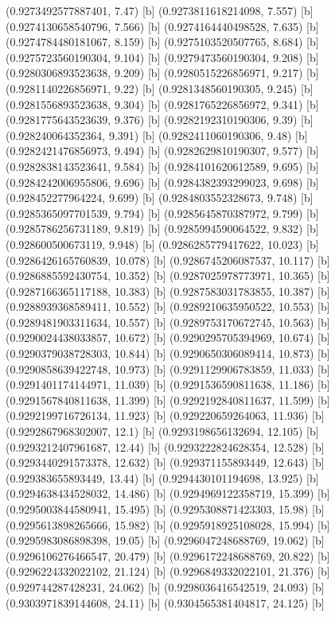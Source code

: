 {{{(0.9273492577887401, 7.47) [b] 
(0.9273811618214098, 7.557) [b] 
(0.9274130658540796, 7.566) [b] 
(0.9274164440498528, 7.635) [b] 
(0.9274784480181067, 8.159) [b] 
(0.9275103520507765, 8.684) [b] 
(0.9275723560190304, 9.104) [b] 
(0.9279473560190304, 9.208) [b] 
(0.9280306893523638, 9.209) [b] 
(0.9280515226856971, 9.217) [b] 
(0.9281140226856971, 9.22) [b] 
(0.9281348560190305, 9.245) [b] 
(0.9281556893523638, 9.304) [b] 
(0.9281765226856972, 9.341) [b] 
(0.9281775643523639, 9.376) [b] 
(0.9282192310190306, 9.39) [b] 
(0.928240064352364, 9.391) [b] 
(0.9282411060190306, 9.48) [b] 
(0.9282421476856973, 9.494) [b] 
(0.9282629810190307, 9.577) [b] 
(0.9282838143523641, 9.584) [b] 
(0.9284101620612589, 9.695) [b] 
(0.9284242006955806, 9.696) [b] 
(0.9284382393299023, 9.698) [b] 
(0.928452277964224, 9.699) [b] 
(0.9284803552328673, 9.748) [b] 
(0.9285365097701539, 9.794) [b] 
(0.9285645870387972, 9.799) [b] 
(0.9285786256731189, 9.819) [b] 
(0.9285994590064522, 9.832) [b] 
(0.928600500673119, 9.948) [b] 
(0.9286285779417622, 10.023) [b] 
(0.9286426165760839, 10.078) [b] 
(0.9286745206087537, 10.117) [b] 
(0.9286885592430754, 10.352) [b] 
(0.9287025978773971, 10.365) [b] 
(0.9287166365117188, 10.383) [b] 
(0.9287583031783855, 10.387) [b] 
(0.9288939368589411, 10.552) [b] 
(0.9289210635950522, 10.553) [b] 
(0.9289481903311634, 10.557) [b] 
(0.9289753170672745, 10.563) [b] 
(0.9290024438033857, 10.672) [b] 
(0.9290295705394969, 10.674) [b] 
(0.9290379038728303, 10.844) [b] 
(0.9290650306089414, 10.873) [b] 
(0.9290858639422748, 10.973) [b] 
(0.9291129906783859, 11.033) [b] 
(0.9291401174144971, 11.039) [b] 
(0.9291536590811638, 11.186) [b] 
(0.9291567840811638, 11.399) [b] 
(0.9292192840811637, 11.599) [b] 
(0.9292199716726134, 11.923) [b] 
(0.929220659264063, 11.936) [b] 
(0.9292867968302007, 12.1) [b] 
(0.9293198656132694, 12.105) [b] 
(0.9293212407961687, 12.44) [b] 
(0.9293222824628354, 12.528) [b] 
(0.9293440291573378, 12.632) [b] 
(0.929371155893449, 12.643) [b] 
(0.929383655893449, 13.44) [b] 
(0.9294430101194698, 13.925) [b] 
(0.9294638434528032, 14.486) [b] 
(0.9294969122358719, 15.399) [b] 
(0.9295003844580941, 15.495) [b] 
(0.9295308871423303, 15.98) [b] 
(0.9295613898265666, 15.982) [b] 
(0.9295918925108028, 15.994) [b] 
(0.9295983086898398, 19.05) [b] 
(0.9296047248688769, 19.062) [b] 
(0.9296106276466547, 20.479) [b] 
(0.9296172248688769, 20.822) [b] 
(0.9296224332022102, 21.124) [b] 
(0.9296849332022101, 21.376) [b] 
(0.929744287428231, 24.062) [b] 
(0.9298036416542519, 24.093) [b] 
(0.9303971839144608, 24.11) [b] 
(0.9304565381404817, 24.125) [b] 
}}}
